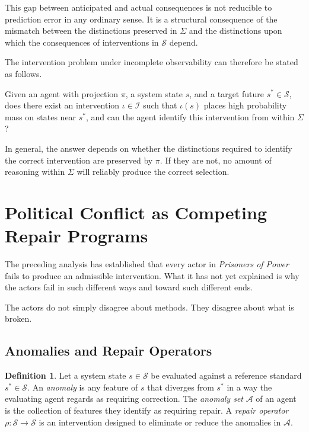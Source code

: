 \documentclass[12pt, a4paper]{article}
\theoremstyle{plain}
\theoremstyle{definition}
\newtheorem{definition}[theorem]{Definition}
\theoremstyle{remark}
\begin{document}
This gap between anticipated and actual
consequences is not reducible to prediction error
in any ordinary sense. It is a structural
consequence of the mismatch between the
distinctions preserved in $\Sigma$ and the
distinctions upon which the consequences of
interventions in $\mathcal{S}$ depend.

The intervention problem under incomplete
observability can therefore be stated as follows.

Given an agent with projection $\pi$, a system
state $s$, and a target future $s^* \in
\mathcal{S}$, does there exist an intervention
$\iota \in \mathcal{I}$ such that $\iota(s)$
places high probability mass on states near $s^*$,
and can the agent identify this intervention from
within $\Sigma$?

In general, the answer depends on whether the
distinctions required to identify the correct
intervention are preserved by $\pi$. If they are
not, no amount of reasoning within $\Sigma$ will
reliably produce the correct selection.

\section{Political Conflict as Competing Repair Programs}

The preceding analysis has established that every
actor in \textit{Prisoners of Power} fails to
produce an admissible intervention. What it has
not yet explained is why the actors fail in such
different ways and toward such different ends.

The actors do not simply disagree about methods.
They disagree about what is broken.

\subsection{Anomalies and Repair Operators}

\begin{definition}
Let a system state $s \in \mathcal{S}$ be
evaluated against a reference standard $s^*
\in \mathcal{S}$. An \emph{anomaly} is any
feature of $s$ that diverges from $s^*$ in a
way the evaluating agent regards as requiring
correction. The \emph{anomaly set} $\mathcal{A}$
of an agent is the collection of features they
identify as requiring repair. A \emph{repair
operator} $\rho: \mathcal{S} \to \mathcal{S}$
is an intervention designed to eliminate or
reduce the anomalies in $\mathcal{A}$.
\end{definition}
\end{document}
